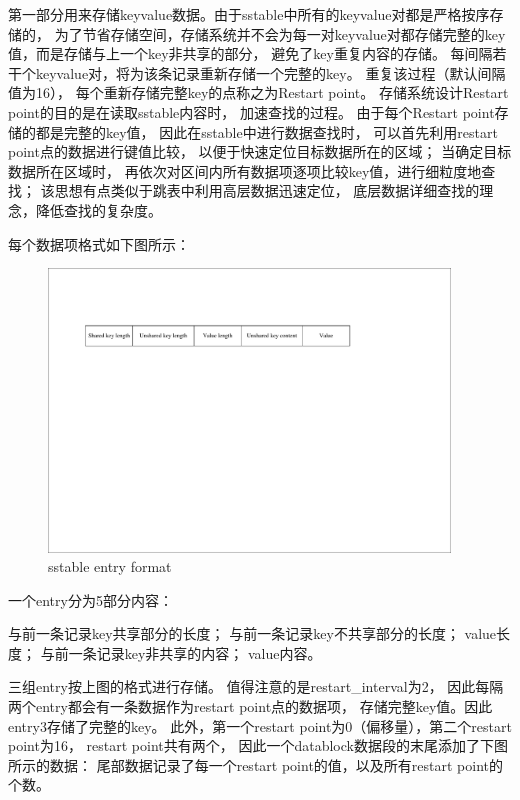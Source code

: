 \begin{enumerate}
\begin{enumerate}
					第一部分用来存储keyvalue数据。由于sstable中所有的keyvalue对都是严格按序存储的，
					为了节省存储空间，存储系统并不会为每一对keyvalue对都存储完整的key值，而是存储与上一个key非共享的部分，
					避免了key重复内容的存储。
					每间隔若干个keyvalue对，将为该条记录重新存储一个完整的key。
					重复该过程（默认间隔值为16），
					每个重新存储完整key的点称之为Restart point。
					存储系统设计Restart point的目的是在读取sstable内容时，
					加速查找的过程。
					由于每个Restart point存储的都是完整的key值，
					因此在sstable中进行数据查找时，
					可以首先利用restart point点的数据进行键值比较，
					以便于快速定位目标数据所在的区域；
					当确定目标数据所在区域时，
					再依次对区间内所有数据项逐项比较key值，进行细粒度地查找；
					该思想有点类似于跳表中利用高层数据迅速定位，
					底层数据详细查找的理念，降低查找的复杂度。
	
					
					每个数据项格式如下图所示：
	
					\begin{figure}[H]
						\centering
						\includegraphics[width=0.95\textwidth]{pdf/entry_format.pdf}
						\caption{sstable entry format}
						\label{sstable_entry_format}
					\end{figure}
	
					一个entry分为5部分内容：
	
	与前一条记录key共享部分的长度；
	与前一条记录key不共享部分的长度；
	value长度；
	与前一条记录key非共享的内容；
	value内容。
	
	
	
	三组entry按上图的格式进行存储。
	值得注意的是restart\_interval为2，
	因此每隔两个entry都会有一条数据作为restart point点的数据项，
	存储完整key值。因此entry3存储了完整的key。
	此外，第一个restart point为0（偏移量），第二个restart point为16，
	restart point共有两个，
	因此一个datablock数据段的末尾添加了下图所示的数据：
	尾部数据记录了每一个restart point的值，以及所有restart point的个数。
	

\end{enumerate}
\end{enumerate}
